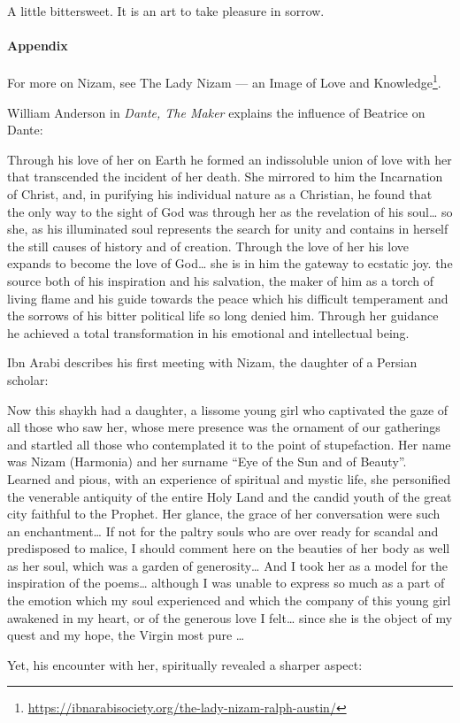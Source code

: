 \begin{quotex}
A little bittersweet. It is an art to take pleasure in sorrow. 

\end{quotex}
\paragraph{Appendix}
For more on Nizam, see The Lady Nizam — an Image of Love and Knowledge\footnote{\url{https://ibnarabisociety.org/the-lady-nizam-ralph-austin/}}.

William Anderson in \emph{Dante, The Maker} explains the influence of Beatrice on Dante:

\begin{quotex}
Through his love of her on Earth he formed an indissoluble union of love with her that transcended the incident of her death. She mirrored to him the Incarnation of Christ, and, in purifying his individual nature as a Christian, he found that the only way to the sight of God was through her as the revelation of his soul… so she, as his illuminated soul represents the search for unity and contains in herself the still causes of history and of creation. Through the love of her his love expands to become the love of God… she is in him the gateway to ecstatic joy. the source both of his inspiration and his salvation, the maker of him as a torch of living flame and his guide towards the peace which his difficult temperament and the sorrows of his bitter political life so long denied him. Through her guidance he achieved a total transformation in his emotional and intellectual being. 

\end{quotex}
Ibn Arabi describes his first meeting with Nizam, the daughter of a Persian scholar:

\begin{quotex}
Now this shaykh had a daughter, a lissome young girl who captivated the gaze of all those who saw her, whose mere presence was the ornament of our gatherings and startled all those who contemplated it to the point of stupefaction. Her name was Nizam (Harmonia) and her surname “Eye of the Sun and of Beauty”. Learned and pious, with an experience of spiritual and mystic life, she personified the venerable antiquity of the entire Holy Land and the candid youth of the great city faithful to the Prophet. Her glance, the grace of her conversation were such an enchantment… If not for the paltry souls who are over ready for scandal and predisposed to malice, I should comment here on the beauties of her body as well as her soul, which was a garden of generosity… And I took her as a model for the inspiration of the poems… although I was unable to express so much as a part of the emotion which my soul experienced and which the company of this young girl awakened in my heart, or of the generous love I felt… since she is the object of my quest and my hope, the Virgin most pure … 

\end{quotex}
Yet, his encounter with her, spiritually revealed a sharper aspect:


